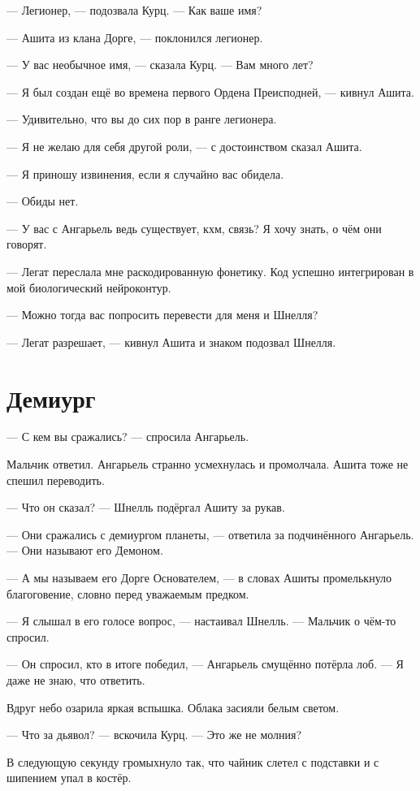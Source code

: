 --- Легионер, --- подозвала Курц.
--- Как ваше имя?

--- Ашита из клана Дорге, --- поклонился легионер.

--- У вас необычное имя, --- сказала Курц.
--- Вам много лет?

--- Я был создан ещё во времена первого Ордена Преисподней, --- кивнул Ашита.

--- Удивительно, что вы до сих пор в ранге легионера.

--- Я не желаю для себя другой роли, --- с достоинством сказал Ашита.

--- Я приношу извинения, если я случайно вас обидела.

--- Обиды нет.

--- У вас с Ангарьель ведь существует, кхм, связь?
Я хочу знать, о чём они говорят.

--- Легат переслала мне раскодированную фонетику.
Код успешно интегрирован в мой биологический нейроконтур.

--- Можно тогда вас попросить перевести для меня и Шнелля?

--- Легат разрешает, --- кивнул Ашита и знаком подозвал Шнелля.

\section{Демиург}

--- С кем вы сражались? --- спросила Ангарьель.

Мальчик ответил.
Ангарьель странно усмехнулась и промолчала.
Ашита тоже не спешил переводить.

--- Что он сказал? --- Шнелль подёргал Ашиту за рукав.

--- Они сражались с демиургом планеты, --- ответила за подчинённого Ангарьель.
--- Они называют его Демоном.

--- А мы называем его Дорге Основателем, --- в словах Ашиты промелькнуло благоговение, словно перед уважаемым предком.

--- Я слышал в его голосе вопрос, --- настаивал Шнелль.
--- Мальчик о чём-то спросил.

--- Он спросил, кто в итоге победил, --- Ангарьель смущённо потёрла лоб.
--- Я даже не знаю, что ответить.

Вдруг небо озарила яркая вспышка.
Облака засияли белым светом.

--- Что за дьявол? --- вскочила Курц.
--- Это же не молния?

В следующую секунду громыхнуло так, что чайник слетел с подставки и с шипением упал в костёр.

